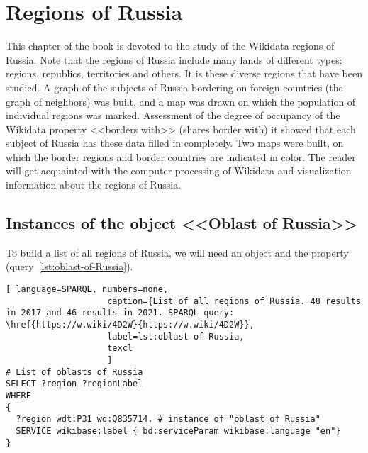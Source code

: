 \chapter{Regions of Russia}
\label{ch:oblast-of-Russia}


This chapter of the book is devoted to the study of the Wikidata regions of Russia. 
Note that the regions of Russia include many lands of different
types: regions, republics, territories and others. It is these diverse regions
that have been studied. A graph of the subjects of Russia bordering
on foreign countries (the graph of neighbors) was built, and a map was drawn
on which the population of individual regions was marked. Assessment
of the degree of occupancy of the Wikidata property <<borders with>> (shares border with) 
it showed that each subject of Russia has these data filled in completely. Two maps were built, on which the border regions and border countries are indicated in color.
The reader will get acquainted with the computer processing of Wikidata and visualization 
information about the regions of Russia.

\label{question:q_subjects_of_Russia_3}

\section{Instances of the object <<Oblast of Russia>>}

To build a list of all regions of Russia, we will need an object 
 and the property 
(query~\protect\ref{lst:oblast-of-Russia}).

\begin{lstlisting}[ language=SPARQL, numbers=none,
                    caption={List of all regions of Russia. 48 results in 2017 and 46 results in 2021. SPARQL query: \href{https://w.wiki/4D2W}{https://w.wiki/4D2W}},
                    label=lst:oblast-of-Russia,
                    texcl 
                    ]
# List of oblasts of Russia
SELECT ?region ?regionLabel
WHERE
{
  ?region wdt:P31 wd:Q835714. # instance of "oblast of Russia"
  SERVICE wikibase:label { bd:serviceParam wikibase:language "en"}
}
\end{lstlisting}%

